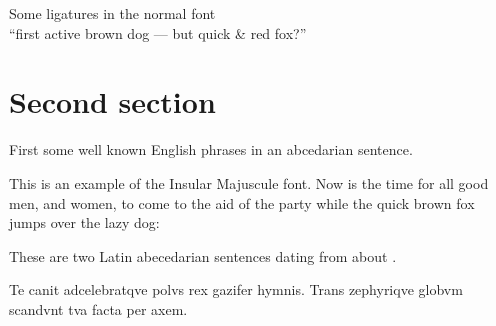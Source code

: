 \documentclass{article}
\newcommand{\Romannum}[1]{\uppercase\expandafter{\romannumeral #1}}
\newcommand{\Sentence}{%
This is an example of the Insular Majuscule font. Now is the time for all good
men, and women, to come to the aid of the party while the quick brown fox
jumps over the lazy dog:}
\newcommand{\latin}{Te canit adcelebratqve polvs rex gazifer hymnis.
  Trans zephyriqve globvm scandvnt tva facta per axem.}
\begin{document}
\begin{center}
    Some ligatures in the normal font \\
{``first active brown dog --- but quick \& red fox?''}
\end{center}

\section{Second section}

    First some well known English phrases in an abcedarian sentence.

\Sentence{}

    These are two Latin abecedarian sentences dating from about 
\Romannum{790}.

\latin{}

\end{document}
